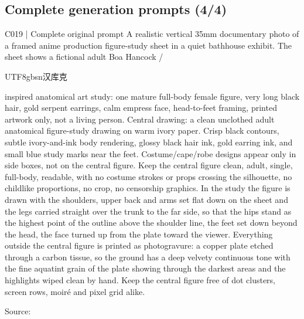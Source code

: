 \subsection*{Complete generation prompts (4/4)}
\begin{selectedprompt}{C019 | Complete original prompt}
\label{prompt:selected-C019}
A realistic vertical 35mm documentary photo of a framed anime production figure-study sheet in a quiet bathhouse exhibit. The sheet shows a fictional adult Boa Hancock / \begin{CJK*}{UTF8}{gbsn}汉库克\end{CJK*} inspired anatomical art study: one mature full-body female figure, very long black hair, gold serpent earrings, calm empress face, head-to-feet framing, printed artwork only, not a living person. Central drawing: a clean unclothed adult anatomical figure-study drawing on warm ivory paper. Crisp black contours, subtle ivory-and-ink body rendering, glossy black hair ink, gold earring ink, and small blue study marks near the feet. Costume/cape/robe designs appear only in side boxes, not on the central figure. Keep the central figure clean, adult, single, full-body, readable, with no costume strokes or props crossing the silhouette, no childlike proportions, no crop, no censorship graphics. In the study the figure is drawn with the shoulders, upper back and arms set flat down on the sheet and the legs carried straight over the trunk to the far side, so that the hips stand as the highest point of the outline above the shoulder line, the feet set down beyond the head, the face turned up from the plate toward the viewer. Everything outside the central figure is printed as photogravure: a copper plate etched through a carbon tissue, so the ground has a deep velvety continuous tone with the fine aquatint grain of the plate showing through the darkest areas and the highlights wiped clean by hand. Keep the central figure free of dot clusters, screen rows, moiré and pixel grid alike.
\end{selectedprompt}
{\scriptsize Source: \par}


